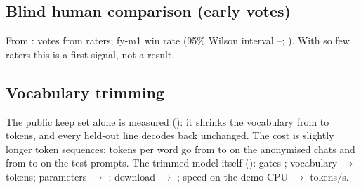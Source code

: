 \documentclass[11pt]{article}
\begin{document}
\subsection{Blind human comparison (early votes)}
From : \fyArenaVotes{} votes from \fyArenaRaters{} raters; fy-m1 win rate
\fyArenaWinRate{} (95\% Wilson interval \fyArenaCiLow{}--\fyArenaCiHigh{}; \citealp{wilson1927}).
With so few raters this is a first signal, not a result.

\subsection{Vocabulary trimming}
The public keep set alone is measured (): it shrinks the vocabulary
from \fyCostVocabBefore{} to \fyCostVocabAfter{} tokens, and every held-out line decodes back unchanged.
The cost is slightly longer token sequences: tokens per word go from \fyCostTpwChatsBefore{} to
\fyCostTpwChatsAfter{} on the anonymised chats and from \fyCostTpwPromptsBefore{} to
\fyCostTpwPromptsAfter{} on the test prompts. The trimmed model itself (): gates
\fyTrimGates{}; vocabulary \fyVocabBefore{} $\to$ \fyVocabAfter{} tokens; parameters \fyParamsBefore{}
$\to$ \fyParamsAfter{}; download \fyGgufBefore{} $\to$ \fyGgufAfter{}; speed on the demo CPU
\fyTpsBefore{} $\to$ \fyTpsAfter{} tokens/s.
\end{document}
